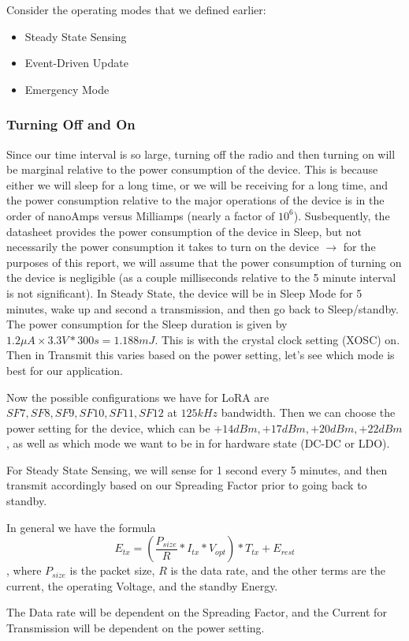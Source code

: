 Consider the operating modes that we defined earlier: 
\begin{itemize}
    \item Steady State Sensing
    \item Event-Driven Update
    \item Emergency Mode
\end{itemize}
\subsubsection{Turning Off and On}
Since our time interval is so large, turning off the radio and then turning on will be marginal relative to the power consumption of the device. This is because either we will sleep for a long time, or we will be receiving for a long time, and the power consumption relative to the major operations of the device is in the order of nanoAmps versus Milliamps (nearly a factor of $10^6$). Susbequently, the datasheet provides the power consumption of the device in Sleep, but not necessarily the power consumption it takes to turn on the device $\rightarrow$ for the purposes of this report, we will assume that the power consumption of turning on the device is negligible (as a couple milliseconds relative to the 5 minute interval is not significant). 
In Steady State, the device will be in Sleep Mode for 5 minutes, wake up and second a transmission, and then go back to Sleep/standby. The power consumption for the Sleep duration is given by $1.2 \mu A \times 3.3 V * 300 s = 1.188 mJ$. This is with the crystal clock setting (XOSC) on. Then in Transmit this varies based on the power setting, let's see which mode is best for our application. 

Now the possible configurations we have for LoRA are 
$SF7, SF8, SF9, SF10, SF11, SF12$ at $125 kHz$ bandwidth. Then we can choose the power setting for the device, which can be $+14 dBm, +17 dBm, +20 dBm, +22 dBm$, as well as which mode we want to be in for hardware state (DC-DC or LDO).

For Steady State Sensing, we will sense for 1 second every 5 minutes, and then transmit accordingly based on our Spreading Factor prior to going back to standby. 

In general we have the formula $$E_{tx} = (\frac{P_{size}}{R} * I_{tx} * V_{opt}) * T_{tx} + E_{rest}$$, where $P_{size}$ is the packet size, $R$ is the data rate, and the other terms are the current, the operating Voltage, and the standby Energy. 

The Data rate will be dependent on the Spreading Factor, and the Current for Transmission will be dependent on the power setting.
